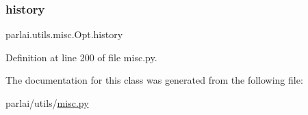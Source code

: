 \subsubsection{\texorpdfstring{history}{history}}
{\footnotesize\ttfamily parlai.\+utils.\+misc.\+Opt.\+history}



Definition at line 200 of file misc.\+py.



The documentation for this class was generated from the following file\+:\begin{DoxyCompactItemize}
\item 
parlai/utils/\hyperlink{misc_8py}{misc.\+py}\end{DoxyCompactItemize}
